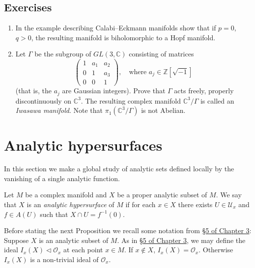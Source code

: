 \subsection*{Exercises}
\begin{enumerate}
\item In the example describing Calabi--Eckmann manifolds show that if $p=0$, $q>0$, the resulting manifold is biholomorphic to a Hopf manifold.
\item Let $\Gamma$ be the subgroup of $GL(3,\mathbb C)$ consisting of matrices
\[
\begin{pmatrix}1&a_1&a_2\\0&1&a_3\\0&0&1\end{pmatrix},
\quad\text{where }a_j\in\mathbb Z[\sqrt{-1}]
\]
(that is, the $a_j$ are Gaussian integers).
Prove that $\Gamma$ acts freely, properly discontinuously on $\mathbb C^3$. The resulting complex manifold $\mathbb C^3/\Gamma$ is called an \emph{Iwasawa manifold}. Note that $\pi_1(\mathbb C^3/\Gamma)$ is not Abelian.
\end{enumerate}

\section{Analytic hypersurfaces}\label{sec:4:6}
In this section we make a global study of analytic sets defined locally by the vanishing of a single analytic function.

 Let $M$ be a complex manifold and $X$ be a proper analytic subset of $M$. We say that $X$ is an \emph{analytic hypersurface} of $M$ if for each $x\in X$ there exists $U\in\mathcal U_x$ and $f\in A(U)$ such that $X\cap U=f^{-1}(0)$.

Before stating the next Proposition we recall some notation from \hyperref[sec:3:5]{\S5 of Chapter 3}: Suppose $X$ is an analytic subset of $M$. As in \hyperref[sec:3:5]{\S5 of Chapter 3}, we may define the ideal $I_x(X)\lhd\mathcal O_x$ at each point $x\in M$. If $x\notin X$, $I_x(X)=\mathcal O_x$. Otherwise $I_x(X)$ is a non-trivial ideal of $\mathcal O_x$.

